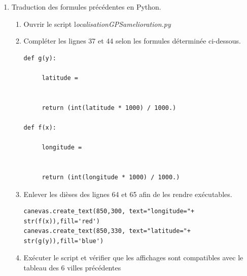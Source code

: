 \documentclass[a4paper,10pt]{article}
\begin{document}
\begin{enumerate}
\item Traduction des formules précédentes en Python.


\begin{enumerate}
\item Ouvrir le script  l\textit{ocalisationGPSamelioration.py}
\item Compléter les lignes 37 et 44 selon les formules déterminée ci-dessous.


\begin{lstlisting}
def g(y):
     	
     latitude =   
     
	
     return (int(latitude * 1000) / 1000.)

def f(x):
     	
     longitude =  
     
	
     return (int(longitude * 1000) / 1000.)

\end{lstlisting}

\item Enlever les dièses  des lignes 64 et 65 afin de les rendre exécutables.
\begin{lstlisting}
canevas.create_text(850,300, text="longitude="+ str(f(x)),fill='red')  
canevas.create_text(850,330, text="latitude="+ str(g(y)),fill='blue')   
\end{lstlisting}   
\item Exécuter le script et vérifier que les affichages sont compatibles avec le tableau des 6 villes précédentes

\end{enumerate}
    
\end{enumerate}
\end{document}
